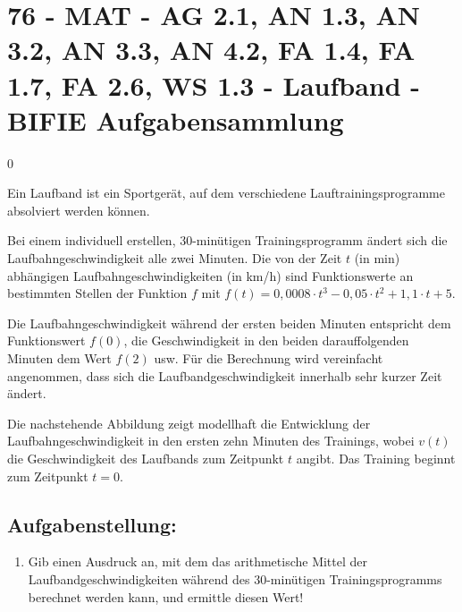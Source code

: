 \section{76 - MAT - AG 2.1, AN 1.3, AN 3.2, AN 3.3, AN 4.2, FA 1.4, FA 1.7, FA 2.6, WS 1.3 - Laufband - BIFIE Aufgabensammlung}

\begin{langesbeispiel} \item[0] %
	
Ein Laufband ist ein Sportgerät, auf dem verschiedene Lauftrainingsprogramme absolviert werden können.

Bei einem individuell erstellen, 30-minütigen Trainingsprogramm ändert sich die Laufbahngeschwindigkeit alle zwei Minuten. Die von der Zeit $t$ (in min) abhängigen Laufbahngeschwindigkeiten (in km/h) sind Funktionswerte an bestimmten Stellen der Funktion $f$ mit $f(t)=0,0008\cdot t^3-0,05\cdot t^2+1,1\cdot t+5$.

Die Laufbahngeschwindigkeit während der ersten beiden Minuten entspricht dem Funktionswert $f(0)$, die Geschwindigkeit in den beiden darauffolgenden Minuten dem Wert $f(2)$ usw. Für die Berechnung wird vereinfacht angenommen, dass sich die Laufbandgeschwindigkeit innerhalb sehr kurzer Zeit ändert.

Die nachstehende Abbildung zeigt modellhaft die Entwicklung der Laufbahngeschwindigkeit in den ersten zehn Minuten des Trainings, wobei $v(t)$ die Geschwindigkeit des Laufbands zum Zeitpunkt $t$ angibt. Das Training beginnt zum Zeitpunkt $t=0$.

\begin{center}
\end{center}

\subsection{Aufgabenstellung:}
\begin{enumerate}
	\item Gib einen Ausdruck an, mit dem das arithmetische Mittel der Laufbandgeschwindigkeiten während des 30-minütigen Trainingsprogramms berechnet werden kann, und ermittle diesen Wert!\leer
	

\end{enumerate}
\end{langesbeispiel}
